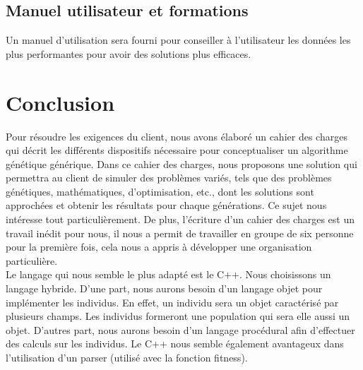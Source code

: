 \documentclass[a4paper,11pt]{article}
\begin{document}
		\subsection{Manuel utilisateur et formations}
		Un manuel d'utilisation sera fourni pour conseiller à l’utilisateur les données les plus performantes pour avoir des solutions plus efficaces.
	
	\section{Conclusion}
		Pour résoudre les exigences du client, nous avons élaboré un cahier des charges qui décrit les différents dispositifs nécessaire pour conceptualiser un algorithme génétique générique. Dans ce cahier des charges, nous proposons une solution qui permettra au client de simuler des problèmes variés, tels que des problèmes génétiques, mathématiques, d’optimisation, etc., dont les solutions sont approchées et obtenir les résultats pour chaque générations. 
		Ce sujet nous intéresse tout particulièrement. De plus, l’écriture d’un cahier des charges est un travail inédit pour nous, il nous a permit de travailler en groupe de six personne pour la première fois, cela nous a appris à développer une organisation particulière.\\
		Le langage qui nous semble le plus adapté est le C++. Nous choisissons un langage hybride. D’une part, nous aurons besoin d’un langage objet pour implémenter les individus. En effet, un individu sera un objet caractérisé par plusieurs champs. Les individus formeront une population qui sera elle aussi un objet. 
		D’autres part, nous aurons besoin d’un langage procédural afin d’effectuer des calculs sur les individus. Le C++ nous semble également avantageux dans l’utilisation d’un parser (utilisé avec la fonction fitness).
	
\end{document}
